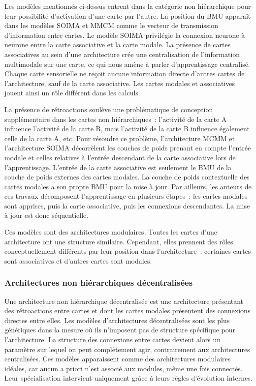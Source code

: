 \documentclass[../main]{subfiles}
\begin{document}
Les modèles mentionnés ci-dessus entrent dans la catégorie non hiérarchique pour leur possibilité d'activation d'une carte par l'autre. 
La position du BMU apparaît dans les modèles SOIMA et MMCM comme le vecteur de transmission d'information  entre cartes.
Le modèle SOIMA privilégie la connexion neurone à neurone entre la carte associative et la carte modale.
La présence de cartes associatives au sein d'une architecture crée une centralisation de l'information multimodale sur une carte, ce qui nous amène à parler d'apprentissage centralisé. 
Chaque carte sensorielle ne reçoit aucune information directe d'autres cartes de l'architecture, sauf de la carte associative.
Les cartes modales et associatives jouent ainsi un rôle différent dans les calculs.

La présence de rétroactions soulève une problématique de conception supplémentaire dans les cartes non hiérarchiques~: l'activité de la carte A influence l'activité de la carte B, mais l'activité de la carte B influence également celle de la carte A, etc. 
Pour résoudre ce problème, l'architecture MCMM et l'architecture SOIMA décorrèlent les couches de poids prenant en compte l'entrée modale et celles relatives à l'entrée descendant de la carte associative lors de l'apprentissage.
L'entrée de la carte associative est seulement le BMU de la couche de poids externes des cartes modales. La couche de poids contextuelle des cartes modales a son propre BMU pour la mise à jour. 
Par ailleurs, les auteurs de ces travaux décomposent l'apprentissage en plusieurs étapes~: les cartes modales sont apprises, puis la carte associative, puis les connexions descendantes. La mise à jour est donc séquentielle.

Ces modèles sont des architectures modulaires. Toutes les cartes d'une architecture ont une structure similaire. Cependant, elles prennent des rôles conceptuellement différents par leur position dans l'architecture~: certaines cartes sont associatives et d'autres cartes sont modales.

\subsubsection{Architectures non hiérarchiques décentralisées}

Une architecture non hiérarchique décentralisée est une architecture présentant des rétroactions entre cartes et dont les cartes modales présentent des connexions directes entre elles.
Les modèles d'architectures décentralisées sont les plus génériques dans la mesure où ils n'imposent pas de structure spécifique pour l'architecture.
La structure des connexions entre cartes devient alors un paramètre sur lequel on peut complètement agir, contrairement aux architectures centralisées. 
Ces modèles apparaissent comme des architectures modulaires idéales, car aucun a priori n'est associé aux modules, même une fois connectés. Leur spécialisation intervient uniquement grâce à leurs règles d'évolution internes.
\end{document}
